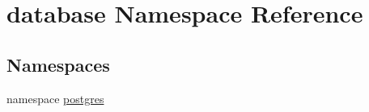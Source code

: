 \hypertarget{namespacedatabase}{
\section{database Namespace Reference}
\label{namespacedatabase}
}
\subsection*{Namespaces}
\begin{DoxyCompactItemize}
\item 
namespace \hyperlink{namespacedatabase_1_1postgres}{postgres}
\end{DoxyCompactItemize}

